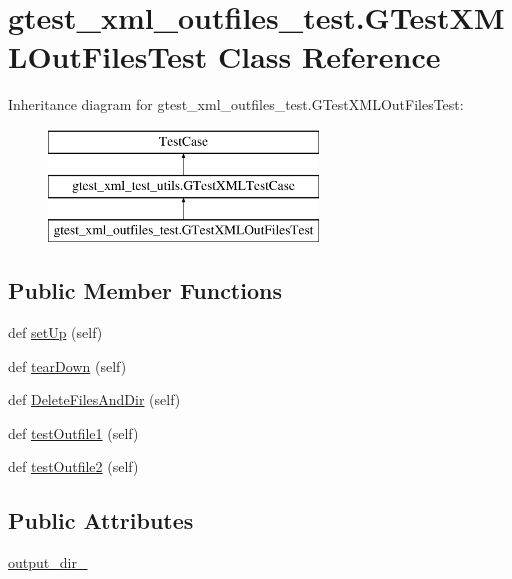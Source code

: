 \hypertarget{classgtest__xml__outfiles__test_1_1_g_test_x_m_l_out_files_test}{}\section{gtest\+\_\+xml\+\_\+outfiles\+\_\+test.\+G\+Test\+X\+M\+L\+Out\+Files\+Test Class Reference}
\label{classgtest__xml__outfiles__test_1_1_g_test_x_m_l_out_files_test}
Inheritance diagram for gtest\+\_\+xml\+\_\+outfiles\+\_\+test.\+G\+Test\+X\+M\+L\+Out\+Files\+Test\+:\begin{figure}[H]
\begin{center}
\leavevmode
\includegraphics[height=3.000000cm]{classgtest__xml__outfiles__test_1_1_g_test_x_m_l_out_files_test}
\end{center}
\end{figure}
\subsection*{Public Member Functions}
\begin{DoxyCompactItemize}
\item 
def \hyperlink{classgtest__xml__outfiles__test_1_1_g_test_x_m_l_out_files_test_a56550f293277d18c36e868a637fe1153}{set\+Up} (self)
\item 
def \hyperlink{classgtest__xml__outfiles__test_1_1_g_test_x_m_l_out_files_test_a49d1d410370ba8a3cfcc281eaadb5706}{tear\+Down} (self)
\item 
def \hyperlink{classgtest__xml__outfiles__test_1_1_g_test_x_m_l_out_files_test_a503d2fbc9cd782ae57ac4307d2db43e1}{Delete\+Files\+And\+Dir} (self)
\item 
def \hyperlink{classgtest__xml__outfiles__test_1_1_g_test_x_m_l_out_files_test_a034738bbc00ac46d00f183402c561228}{test\+Outfile1} (self)
\item 
def \hyperlink{classgtest__xml__outfiles__test_1_1_g_test_x_m_l_out_files_test_a3c02687f092a482d0d0260c7ed94c618}{test\+Outfile2} (self)
\end{DoxyCompactItemize}
\subsection*{Public Attributes}
\begin{DoxyCompactItemize}
\item 
\hyperlink{classgtest__xml__outfiles__test_1_1_g_test_x_m_l_out_files_test_aa5c31cd97047bc1d3060f4d27bc956a4}{output\+\_\+dir\+\_\+}
\end{DoxyCompactItemize}
